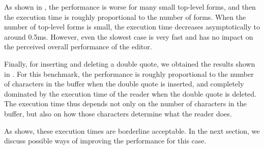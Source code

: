 As shown in , the performance is
worse for many small top-level forms, and then the execution time is
roughly proportional to the number of forms.  When the number of
top-level forms is small, the execution time decreases asymptotically
to around 0.5ms.  However, even the slowest case is very fast and has
no impact on the perceived overall performance of the editor.

Finally, for inserting and deleting a double quote, we obtained the
results shown in .  For this
benchmark, the performance is roughly proportional to the number of
characters in the buffer when the double quote is inserted, and
completely dominated by the execution time of the reader when the
double quote is deleted.  The execution time thus depends not only on
the number of characters in the buffer, but also on how those
characters determine what the reader does.

\begin{table}[htb]
\end{table}

\noindent
As  shows, these execution times
are borderline acceptable.  In the next section, we discuss possible
ways of improving the performance for this case.
